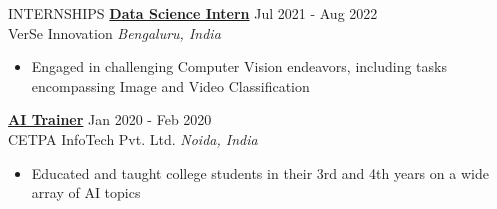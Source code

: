 \documentclass{resume} %
\begin{document}
\begin{rSection}{INTERNSHIPS}
 \textbf{\href{https://drive.google.com/file/d/1nJ8vXmALlt--85MqqDsExyLhBGVUJEuy/view?usp=sharing}{Data Science Intern}} \hfill Jul 2021 - Aug 2022\\
VerSe Innovation \hfill \textit{Bengaluru, India}
\vspace{-6pt}
 \begin{itemize}
    \itemsep -6pt {} 
     \item Engaged in challenging Computer Vision endeavors, including tasks encompassing Image and Video Classification
\end{itemize}

\textbf{\href{https://drive.google.com/file/d/1WbFtlmQf4tBE1oLfCD2rgwM5YAAHLfI0/view?usp=sharing}{AI Trainer}} \hfill Jan 2020 - Feb 2020\\
CETPA InfoTech Pvt. Ltd. \hfill \textit{Noida, India}
\vspace{-6pt}
 \begin{itemize}
    \itemsep -6pt {} 
     \item Educated and taught college students in their 3rd and 4th years on a wide array of AI topics
\end{itemize}


\end{rSection}
\end{document}
